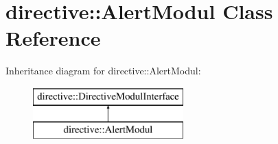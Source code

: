 \hypertarget{classdirective_1_1AlertModul}{}\section{directive\+:\+:Alert\+Modul Class Reference}
\label{classdirective_1_1AlertModul}
Inheritance diagram for directive\+:\+:Alert\+Modul\+:\begin{figure}[H]
\begin{center}
\leavevmode
\includegraphics[height=2.000000cm]{dc/d40/classdirective_1_1AlertModul}
\end{center}
\end{figure}
